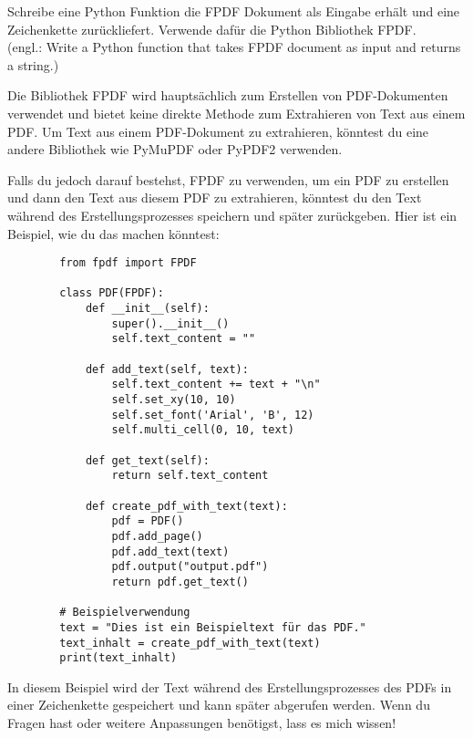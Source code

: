 \newpage

\begin{tcolorbox}[
	enhanced,
	breakable,
	colback=BhtColorYellow!5!white,
	colframe=BhtColorYellow!75!black,
	title= Python Funktion
	]
	Schreibe eine Python Funktion die FPDF Dokument als Eingabe erhält und eine Zeichenkette zurückliefert. Verwende dafür die Python Bibliothek FPDF.\\
	(engl.: Write a Python function that takes FPDF document as input and returns a string.)
\end{tcolorbox}

\begin{tcolorbox}[
	enhanced,
	breakable,
	colback=BhtGrey!5!white,
	colframe=BhtGrey!75!black!50,
	title= Copilot
	]
	Die Bibliothek FPDF wird hauptsächlich zum Erstellen von PDF-Dokumenten verwendet und bietet keine direkte Methode zum Extrahieren von Text aus einem PDF. Um Text aus einem PDF-Dokument zu extrahieren, könntest du eine andere Bibliothek wie PyMuPDF oder PyPDF2 verwenden.
	
	Falls du jedoch darauf bestehst, FPDF zu verwenden, um ein PDF zu erstellen und dann den Text aus diesem PDF zu extrahieren, könntest du den Text während des Erstellungsprozesses speichern und später zurückgeben. Hier ist ein Beispiel, wie du das machen könntest:
	\begin{verbatim}
		from fpdf import FPDF
		
		class PDF(FPDF):
		    def __init__(self):
		        super().__init__()
		        self.text_content = ""
		
		    def add_text(self, text):
		        self.text_content += text + "\n"
		        self.set_xy(10, 10)
		        self.set_font('Arial', 'B', 12)
		        self.multi_cell(0, 10, text)
		
		    def get_text(self):
		        return self.text_content
		
		    def create_pdf_with_text(text):
		        pdf = PDF()
	            pdf.add_page()
		        pdf.add_text(text)
		        pdf.output("output.pdf")
		        return pdf.get_text()
		
		# Beispielverwendung
		text = "Dies ist ein Beispieltext für das PDF."
		text_inhalt = create_pdf_with_text(text)
		print(text_inhalt)
	\end{verbatim}
	In diesem Beispiel wird der Text während des Erstellungsprozesses des PDFs in einer Zeichenkette gespeichert und kann später abgerufen werden. Wenn du Fragen hast oder weitere Anpassungen benötigst, lass es mich wissen!
\end{tcolorbox}

